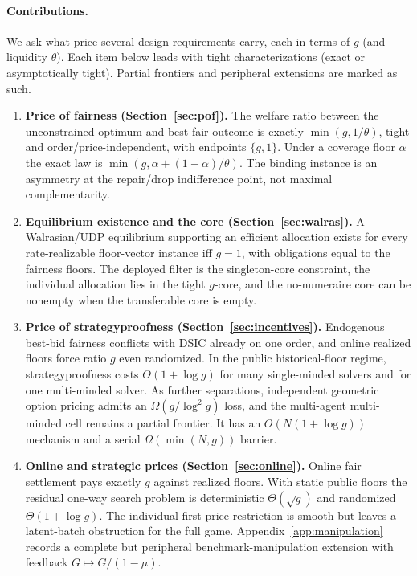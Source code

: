 \documentclass{llncs}
\begin{document}
\paragraph{Contributions.}
We ask what price several design requirements carry, each in terms of $g$
(and liquidity $\theta$). Each item below leads with tight
characterizations (exact or asymptotically tight). Partial frontiers and
peripheral extensions are marked as such.
\begin{enumerate}[leftmargin=*,itemsep=2pt]
\item \textbf{Price of fairness (Section~\ref{sec:pof}).} The welfare
ratio between the unconstrained optimum and best fair outcome is exactly
$\min(g,1/\theta)$, tight and order/price-independent, with endpoints
$\{g,1\}$. Under a coverage floor $\alpha$ the exact law is
$\min(g,\alpha+(1-\alpha)/\theta)$. The binding instance is an asymmetry
at the repair/drop indifference point, not maximal complementarity.

\item \textbf{Equilibrium existence and the core
(Section~\ref{sec:walras}).} A Walrasian/UDP equilibrium supporting an
efficient allocation exists for every rate-realizable floor-vector
instance iff $g=1$, with obligations equal to the fairness floors. The
deployed filter is the singleton-core constraint, the individual allocation
lies in the tight $g$-core, and the no-numeraire core can be nonempty when
the transferable core is empty.

\item \textbf{Price of strategyproofness (Section~\ref{sec:incentives}).}
Endogenous best-bid fairness conflicts with DSIC already on one order,
and online realized floors force ratio $g$ even randomized. In the public
historical-floor regime, strategyproofness costs $\Theta(1+\log g)$ for
many single-minded solvers and for one multi-minded solver. As further
separations, independent geometric option pricing admits an
$\Omega(g/\log^2 g)$ loss, and the multi-agent multi-minded cell remains a
partial frontier. It has an $O(N(1+\log g))$ mechanism and a serial
$\Omega(\min(N,g))$ barrier.

\item \textbf{Online and strategic prices (Section~\ref{sec:online}).}
Online fair settlement pays exactly $g$ against realized floors. With
static public floors the residual one-way search problem is deterministic
$\Theta(\sqrt g)$ and randomized $\Theta(1+\log g)$. The individual
first-price restriction is smooth but leaves a latent-batch obstruction
for the full game. Appendix~\ref{app:manipulation} records a complete but
peripheral benchmark-manipulation extension with feedback
$G\mapsto G/(1-\mu)$.
\end{enumerate}
\end{document}
